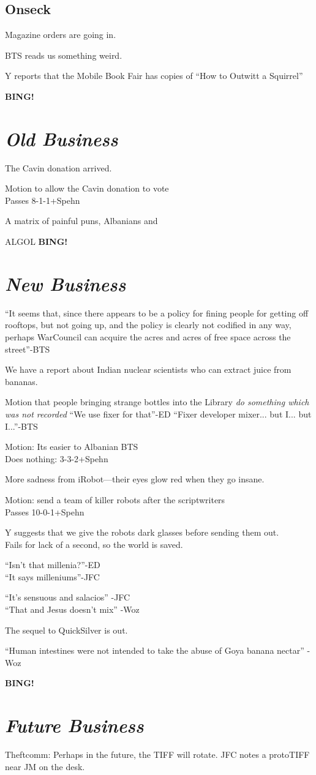 \documentclass[10pt]{article}
\newcommand{\bing}{{\bf BING!} }
\newcommand{\goto}[1]{\bing \vskip 12pt \section*{{\em{#1}}}}
\begin{document}
\subsection*{Onseck}
Magazine orders are going in.

BTS reads us something weird.

Y reports that the Mobile Book Fair has copies of ``How to Outwitt a Squirrel''

\goto{Old Business}
The Cavin donation arrived. 

Motion to allow the Cavin donation to vote\\
Passes 8-1-1+Spehn

A matrix of painful puns, Albanians and 

ALGOL
\goto{New Business}
``It seems that, since there appears to be a policy for fining people
for getting off rooftops, but not going up, and the policy is clearly
not codified in any way, perhaps WarCouncil can acquire the acres and
acres of free space across the street''-BTS

We have a report about Indian nuclear scientists who can extract juice
from bananas. 


Motion that people bringing strange bottles into the Library \emph{do
  something which was not recorded}
``We use fixer for that''-ED
``Fixer developer mixer... but I... but I...''-BTS

Motion: Its easier to Albanian BTS\\
Does nothing: 3-3-2+Spehn

More sadness from iRobot---their eyes glow red when they go insane.

Motion: send a team of killer robots after the scriptwriters\\
Passes 10-0-1+Spehn

Y suggests that we give the robots dark glasses before sending them out.\\
Fails for lack of a second, so the world is saved.

``Isn't that millenia?''-ED\\
``It says milleniums''-JFC

``It's sensuous and salacios'' -JFC\\
``That and Jesus doesn't mix'' -Woz

The sequel to QuickSilver is out.

``Human intestines were not intended to take the abuse of Goya banana
nectar'' -Woz

\goto{Future Business}
Theftcomm: Perhaps in the future, the TIFF will rotate. JFC notes a
protoTIFF near JM on the desk.
\end{document}
